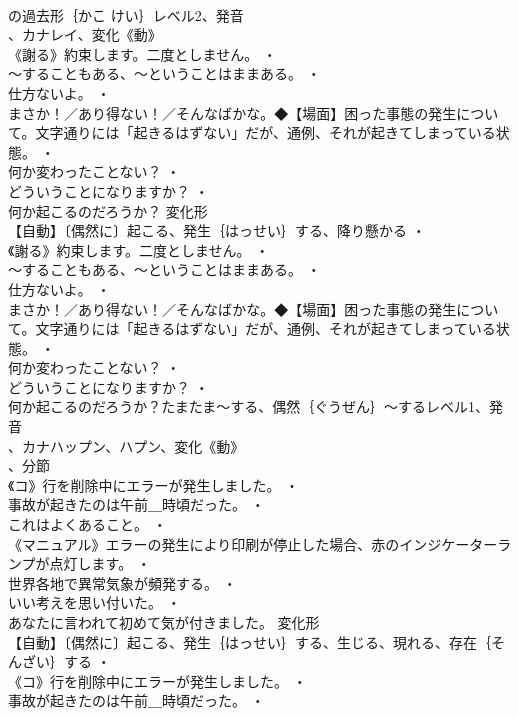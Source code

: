 \documentclass[8pt]{extreport}
\begin{document}
\begin{CJK}{UTF8}{min}
\\	の過去形｛かこ けい｝レベル2、発音
\\	、カナレイ、変化《動》
\\	《謝る》約束します。二度としません。 ・
\\	～することもある、～ということはままある。 ・
\\	仕方ないよ。 ・
\\	まさか！／あり得ない！／そんなばかな。◆【場面】困った事態の発生について。文字通りには「起きるはずない」だが、通例、それが起きてしまっている状態。 ・
\\	何か変わったことない？ ・
\\	どういうことになりますか？ ・
\\	何か起こるのだろうか？	変化形 
\\	【自動】〔偶然に〕起こる、発生｛はっせい｝する、降り懸かる ・
\\	《謝る》約束します。二度としません。 ・
\\	～することもある、～ということはままある。 ・
\\	仕方ないよ。 ・
\\	まさか！／あり得ない！／そんなばかな。◆【場面】困った事態の発生について。文字通りには「起きるはずない」だが、通例、それが起きてしまっている状態。 ・
\\	何か変わったことない？ ・
\\	どういうことになりますか？ ・
\\	何か起こるのだろうか？たまたま～する、偶然｛ぐうぜん｝～するレベル1、発音
\\	、カナハップン、ハプン、変化《動》
\\	、分節
\\	《コ》行を削除中にエラーが発生しました。 ・
\\	事故が起きたのは午前＿時頃だった。 ・
\\	これはよくあること。 ・
\\	《マニュアル》エラーの発生により印刷が停止した場合、赤のインジケーターランプが点灯します。 ・
\\	世界各地で異常気象が頻発する。 ・
\\	いい考えを思い付いた。 ・
\\	あなたに言われて初めて気が付きました。	変化形 
\\	【自動】〔偶然に〕起こる、発生｛はっせい｝する、生じる、現れる、存在｛そんざい｝する ・
\\	《コ》行を削除中にエラーが発生しました。 ・
\\	事故が起きたのは午前＿時頃だった。 ・

\end{CJK}
\end{document}

